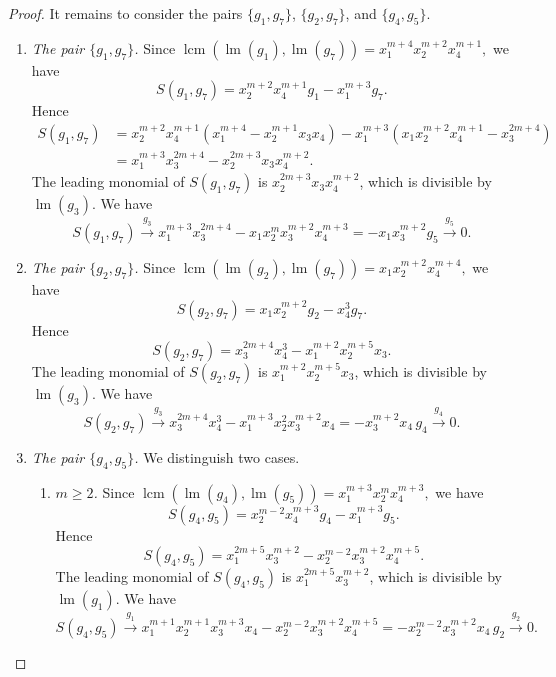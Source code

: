 \documentclass[10pt,a4paper]{amsart}
\begin{document}
\begin{proof}
It remains to consider the pairs
$\{g_1,g_7\}$,
$\{g_2,g_7\}$, and
$\{g_4,g_5\}$.

\begin{enumerate}
\item[\textup{(i)}] \emph{The pair $\{g_1,g_7\}$.} Since
$
\operatorname{lcm}\!\left(\operatorname{lm}(g_1),\operatorname{lm}(g_7)\right)
=
x_1^{m+4}x_2^{m+2}x_4^{m+1},$
we have
\[
S(g_1,g_7)
=
x_2^{m+2}x_4^{m+1}g_1
-
x_1^{m+3}g_7.
\]
Hence
\[
\begin{aligned}
S(g_1,g_7)
&=
x_2^{m+2}x_4^{m+1}
(x_1^{m+4}-x_2^{m+1}x_3x_4)
-
x_1^{m+3}
(x_1x_2^{m+2}x_4^{m+1}-x_3^{2m+4})\\
&=
x_1^{m+3}x_3^{2m+4}
-
x_2^{2m+3}x_3x_4^{m+2}.
\end{aligned}
\]
The leading monomial of $S(g_1,g_7)$ is
$x_2^{2m+3}x_3x_4^{m+2}$, which is divisible by
$\operatorname{lm}(g_3)$. We have
\[S(g_1,g_7)
\stackrel{g_3}{\longrightarrow}
x_1^{m+3}x_3^{2m+4}-x_1x_2^mx_3^{m+2}x_4^{m+3}=
-x_1x_3^{m+2}g_5
\stackrel{g_5}{\longrightarrow}
0.\]

\item[\textup{(ii)}] \emph{The pair $\{g_2,g_7\}$.} Since
$
\operatorname{lcm}\!\left(\operatorname{lm}(g_2),\operatorname{lm}(g_7)\right)
=
x_1x_2^{m+2}x_4^{m+4},$
we have
\[
S(g_2,g_7)
=
x_1x_2^{m+2}g_2
-
x_4^3g_7.
\]
Hence
\[
S(g_2,g_7)
=
x_3^{2m+4}x_4^3
-
x_1^{m+2}x_2^{m+5}x_3.
\]
The leading monomial of $S(g_2,g_7)$ is
$x_1^{m+2}x_2^{m+5}x_3$, which is divisible by
$\operatorname{lm}(g_3)$. We have
\[S(g_2,g_7)
\stackrel{g_3}{\longrightarrow}
x_3^{2m+4}x_4^3-x_1^{m+3}x_2^2x_3^{m+2}x_4=
-x_3^{m+2}x_4\,g_4
\stackrel{g_4}{\longrightarrow}
0.\]

\item[\textup{(iii)}] \emph{The pair $\{g_4,g_5\}$.} We distinguish two cases.

\begin{enumerate}
\item[\textup{(a)}] \emph{$m\ge2$.} Since
$
\operatorname{lcm}\!\left(\operatorname{lm}(g_4),\operatorname{lm}(g_5)\right)
=
x_1^{m+3}x_2^mx_4^{m+3},$
we have
\[
S(g_4,g_5)
=
x_2^{m-2}x_4^{m+3}g_4
-
x_1^{m+3}g_5.
\]
Hence
\[
S(g_4,g_5)
=
x_1^{2m+5}x_3^{m+2}
-
x_2^{m-2}x_3^{m+2}x_4^{m+5}.
\]
The leading monomial of $S(g_4,g_5)$ is
$x_1^{2m+5}x_3^{m+2}$, which is divisible by
$\operatorname{lm}(g_1)$. We have
$$S(g_4,g_5)
\stackrel{g_1}{\longrightarrow}
x_1^{m+1}x_2^{m+1}x_3^{m+3}x_4
-
x_2^{m-2}x_3^{m+2}x_4^{m+5}=
-x_2^{m-2}x_3^{m+2}x_4\,g_2
\stackrel{g_2}{\longrightarrow}
0.$$


\end{enumerate}
\end{enumerate}
\end{proof}
\end{document}
